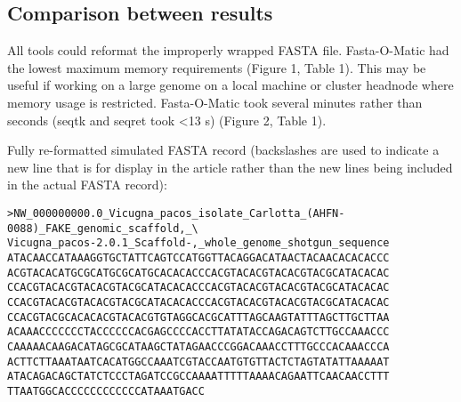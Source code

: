 \subsection{Comparison between results}

All tools could reformat the improperly wrapped FASTA file. Fasta-O-Matic had the lowest maximum memory requirements (Figure 1, Table 1). This may be useful if working on a large genome on a local machine or cluster headnode where memory usage is restricted. Fasta-O-Matic took several minutes rather than seconds (seqtk and seqret took <13 s) (Figure 2, Table 1). 

Fully re-formatted simulated FASTA record (backslashes are used to indicate a new line that is for display in the article rather than the new lines being included in the actual FASTA record):
\begin{verbatim}
>NW_000000000.0_Vicugna_pacos_isolate_Carlotta_(AHFN-0088)_FAKE_genomic_scaffold,_\
Vicugna_pacos-2.0.1_Scaffold-,_whole_genome_shotgun_sequence
ATACAACCATAAAGGTGCTATTCAGTCCATGGTTACAGGACATAACTACAACACACACCC
ACGTACACATGCGCATGCGCATGCACACACCCACGTACACGTACACGTACGCATACACAC
CCACGTACACGTACACGTACGCATACACACCCACGTACACGTACACGTACGCATACACAC
CCACGTACACGTACACGTACGCATACACACCCACGTACACGTACACGTACGCATACACAC
CCACGTACGCACACACGTACACGTGTAGGCACGCATTTAGCAAGTATTTAGCTTGCTTAA
ACAAACCCCCCCTACCCCCCACGAGCCCCACCTTATATACCAGACAGTCTTGCCAAACCC
CAAAAACAAGACATAGCGCATAAGCTATAGAACCCGGACAAACCTTTGCCCACAAACCCA
ACTTCTTAAATAATCACATGGCCAAATCGTACCAATGTGTTACTCTAGTATATTAAAAAT
ATACAGACAGCTATCTCCCTAGATCCGCCAAAATTTTTAAAACAGAATTCAACAACCTTT
TTAATGGCACCCCCCCCCCCCATAAATGACC
\end{verbatim}
  
  
  
  
  
  
  
  
  